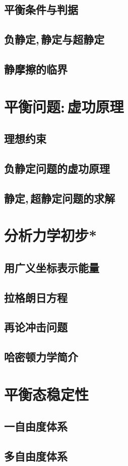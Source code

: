 \subsection{平衡条件与判据}

\subsection{负静定,\,静定与超静定}

\subsection{静摩擦的临界}

\section{平衡问题:\,虚功原理}

\subsection{理想约束}

\subsection{负静定问题的虚功原理}

\subsection{静定,\,超静定问题的求解}

\section{分析力学初步*}

\subsection{用广义坐标表示能量}

\subsection{拉格朗日方程}

\subsection{再论冲击问题}

\subsection{哈密顿力学简介}

\section{平衡态稳定性}

\subsection{一自由度体系}

\subsection{多自由度体系}
